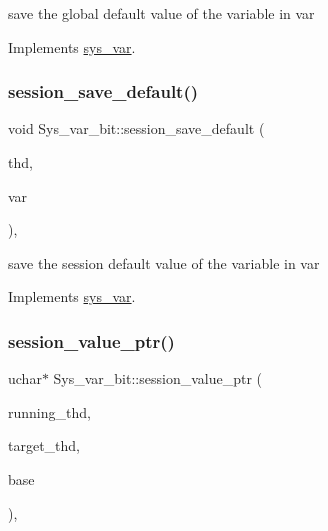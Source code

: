 save the global default value of the variable in var 

Implements \mbox{\hyperlink{classsys__var}{sys\+\_\+var}}.

\mbox{\label{classSys__var__bit_a9611a980dc87e18859904f481f51a164}} 
\subsubsection{\texorpdfstring{session\+\_\+save\+\_\+default()}{session\_save\_default()}}
{\footnotesize\ttfamily void Sys\+\_\+var\+\_\+bit\+::session\+\_\+save\+\_\+default (\begin{DoxyParamCaption}\item[{T\+HD $\ast$}]{thd,  }\item[{\mbox{\hyperlink{classset__var}{set\+\_\+var}} $\ast$}]{var }\end{DoxyParamCaption})\hspace{0.3cm}{\ttfamily [inline]}, {\ttfamily [virtual]}}

save the session default value of the variable in var 

Implements \mbox{\hyperlink{classsys__var}{sys\+\_\+var}}.

\mbox{\label{classSys__var__bit_a2fdba870c82b26cb3777a7cab918412a}} 
\subsubsection{\texorpdfstring{session\+\_\+value\+\_\+ptr()}{session\_value\_ptr()}}
{\footnotesize\ttfamily uchar$\ast$ Sys\+\_\+var\+\_\+bit\+::session\+\_\+value\+\_\+ptr (\begin{DoxyParamCaption}\item[{T\+HD $\ast$}]{running\+\_\+thd,  }\item[{T\+HD $\ast$}]{target\+\_\+thd,  }\item[{L\+E\+X\+\_\+\+S\+T\+R\+I\+NG $\ast$}]{base }\end{DoxyParamCaption})\hspace{0.3cm}{\ttfamily [inline]}, {\ttfamily [virtual]}}


